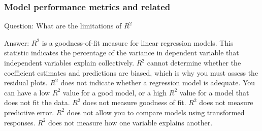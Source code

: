 \documentclass[11pt]{beamer}
\begin{document}
\begin{frame}
\frametitle{Model performance metrics and related}
\begin{block}{Question:}
	What are the limitations of $R^2$
\end{block}
\begin{block}{Answer:}
	$R^2$ is a goodness-of-fit measure for linear regression models. This statistic indicates the percentage of the variance in dependent variable that independent variables explain collectively. 
	$R^2$ cannot determine whether the coefficient estimates and predictions are biased, which is why you must assess the residual plots.
	$R^2$ does not indicate whether a regression model is adequate. You can have a low $R^2$ value for a good model, or a high $R^2$ value for a model that does not fit the data.
	$R^2$ does not measure goodness of fit.
	$R^2$ does not measure predictive error.
	$R^2$ does not allow you to compare models using transformed responses.
	$R^2$ does not measure how one variable explains another.
\end{block}
\end{frame}
\end{document}
